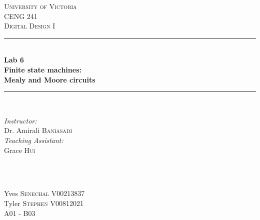 \documentclass[11pt]{article}
\newcommand{\HRule}{\rule{\linewidth}{0.5mm}}
\begin{document}

\begin{titlepage}

\center
 
\textsc{\LARGE University of Victoria}\\[1cm] 	%
\textsc{\Large CENG 241}\\[0.5cm] 			%
\textsc{\large Digital Design I}\\[0.5cm] 		%


\HRule \\[0.4cm]
{\huge \bfseries Lab 6 \\ Finite state machines: \\Mealy and Moore circuits}\\[0.2cm] %
\HRule \\[1.5cm]
 
 
\begin{minipage}{0.7\textwidth}
\begin{flushleft} 

\large\emph{Instructor:} \\
Dr. Amirali \textsc{Baniasadi} \\
\vspace{12 pt}
\emph{Teaching Assistant:} \\
Grace \textsc{Hui}

\end{flushleft}
\end{minipage}
~
\begin{minipage}{0.1\textwidth}
\begin{flushright} \large
\vspace{12 pt}
\end{flushright}
\end{minipage}\\[2cm]


\Large Yves \textsc{Senechal}
\large V00213837	\\
\Large Tyler \textsc{Stephen}
\large V00812021	\\
A01 - B03\\[1.5cm] 



\end{titlepage}
\end{document}
